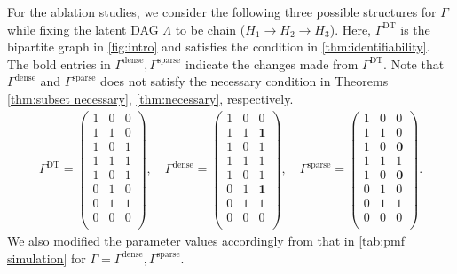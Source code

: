 \documentclass[10pt]{article} %
\begin{document}
For the ablation studies, we consider the following three possible structures for $\Gamma$ while fixing the latent DAG $\Lambda$ to be chain ($H_1 \to H_2 \to H_3$). Here, $\Gamma^{\text{DT}}$ is the bipartite graph in \cref{fig:intro} and satisfies the condition in \cref{thm:identifiability}. The bold entries in $\Gamma^{\text{dense}}, \Gamma^{\text{sparse}}$ indicate the changes made from $\Gamma^{\text{DT}}$. Note that $\Gamma^{\text{dense}}$ and $\Gamma^{\text{sparse}}$ does not satisfy the necessary condition in Theorems \ref{thm:subset necessary}, \ref{thm:necessary}, respectively. 
\begin{align}\label{eq:gamma formula}
    \Gamma^{\text{DT}}= \begin{pmatrix} 1 & 0 & 0 \\ 1 & 1 & 0 \\ 1 & 0 & 1 \\ 1 & 1 & 1 \\ 1 & 0 & 1 \\ 0 & 1 & 0 \\ 0 & 1 & 1 \\ 0 & 0 & 0 \\ \end{pmatrix}, \quad \Gamma^{\text{dense}}= \begin{pmatrix} 1 & 0 & 0 \\ 1 & 1 & \textbf{1} \\ 1 & 0 & 1 \\ 1 & 1 & 1 \\ 1 & 0 & 1 \\ 0 & 1 & \textbf{1} \\ 0 & 1 & 1 \\ 0 & 0 & 0 \\ \end{pmatrix}, \quad \Gamma^{\text{sparse}}= \begin{pmatrix} 1 & 0 & 0 \\ 1 & 1 & 0 \\ 1 & 0 & \textbf{0} \\ 1 & 1 & 1 \\ 1 & 0 & \textbf{0} \\ 0 & 1 & 0 \\ 0 & 1 & 1 \\ 0 & 0 & 0 \\ \end{pmatrix}.
\end{align}
We also modified the parameter values accordingly from that in \cref{tab:pmf simulation} for $\Gamma = \Gamma^{\text{dense}}, \Gamma^{\text{sparse}}$.
\end{document}
